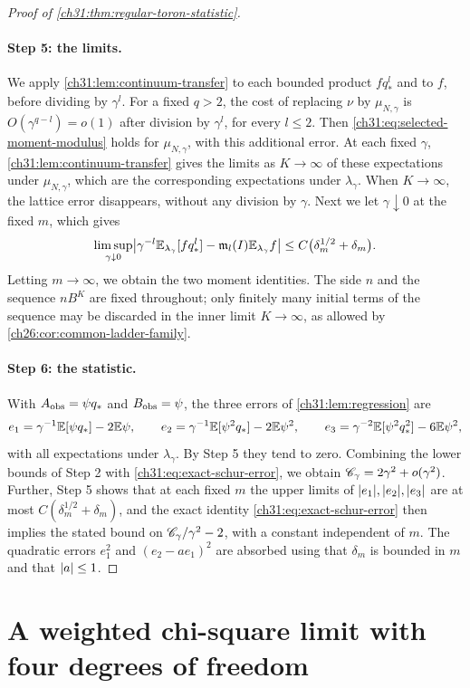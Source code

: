 \begin{proof}[Proof of \cref{ch31:thm:regular-toron-statistic}]
\paragraph{Step 5: the limits.}
We apply \cref{ch31:lem:continuum-transfer} to each bounded product $fq_*^l$ and to $f$, before dividing by $\gamma^l$. For a fixed $q>2$, the cost of replacing $\nu$ by $\mu_{N,\gamma}$ is $O(\gamma^{q-l})=o(1)$ after division by $\gamma^l$, for every $l\le2$. Then \eqref{ch31:eq:selected-moment-modulus} holds for $\mu_{N,\gamma}$, with this additional error. At each fixed $\gamma$, \cref{ch31:lem:continuum-transfer} gives the limits as $K\to\infty$ of these expectations under $\mu_{N,\gamma}$, which are the corresponding expectations under $\lambda_\gamma$. When $K\to\infty$, the lattice error disappears, without any division by $\gamma$. Next we let $\gamma\downarrow0$ at the fixed $m$, which gives
\[
 \limsup_{\gamma\downarrow0}\bigl\lvert\gamma^{-l}\mathbb E_{\lambda_\gamma}[fq_*^l]-\mathfrak m_l(I)\mathbb E_{\lambda_\gamma}f\bigr\rvert\le C\bigl(\delta_m^{1/2}+\delta_m\bigr).
\]
Letting $m\to\infty$, we obtain the two moment identities. The side $n$ and the sequence $nB^K$ are fixed throughout; only finitely many initial terms of the sequence may be discarded in the inner limit $K\to\infty$, as allowed by \cref{ch26:cor:common-ladder-family}.

\paragraph{Step 6: the statistic.}
With $A_{\mathrm{obs}}=\psi q_*$ and $B_{\mathrm{obs}}=\psi$, the three errors of \cref{ch31:lem:regression} are
\[
 e_1=\gamma^{-1}\mathbb E[\psi q_*]-2\mathbb E\psi,\qquad e_2=\gamma^{-1}\mathbb E[\psi^2q_*]-2\mathbb E\psi^2,\qquad e_3=\gamma^{-2}\mathbb E[\psi^2q_*^2]-6\mathbb E\psi^2,
\]
with all expectations under $\lambda_\gamma$. By Step 5 they tend to zero. Combining the lower bounds of Step 2 with \eqref{ch31:eq:exact-schur-error}, we obtain $\mathscr C_\gamma=2\gamma^2+o(\gamma^2)$. Further, Step 5 shows that at each fixed $m$ the upper limits of $\lvert e_1\rvert,\lvert e_2\rvert,\lvert e_3\rvert$ are at most $C(\delta_m^{1/2}+\delta_m)$, and the exact identity \eqref{ch31:eq:exact-schur-error} then implies the stated bound on $\mathscr C_\gamma/\gamma^2-2$, with a constant independent of $m$. The quadratic errors $e_1^2$ and $(e_2-ae_1)^2$ are absorbed using that $\delta_m$ is bounded in $m$ and that $\lvert a\rvert\le1$.
\end{proof}

\section{A weighted chi-square limit with four degrees of freedom}\label{ch31:sec:chi-square}

